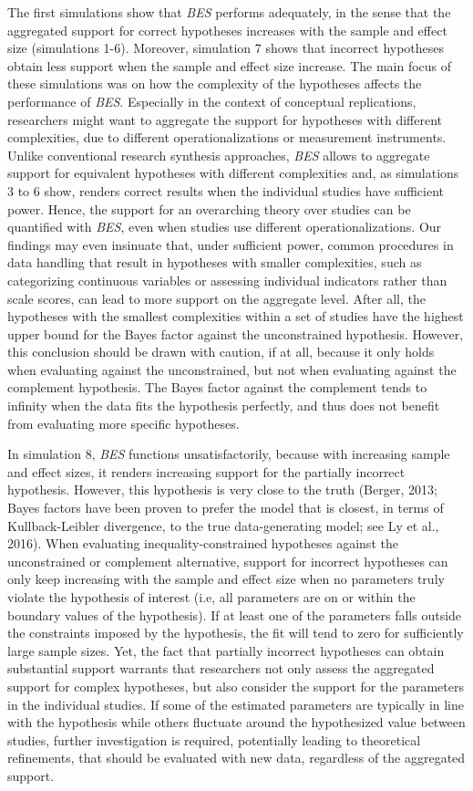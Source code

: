 \documentclass[
]{interact}
\begin{document}
The first simulations show that \emph{BES} performs adequately, in the
sense that the aggregated support for correct hypotheses increases with
the sample and effect size (simulations 1-6). Moreover, simulation 7
shows that incorrect hypotheses obtain less support when the sample and
effect size increase. The main focus of these simulations was on how the
complexity of the hypotheses affects the performance of \emph{BES}.
Especially in the context of conceptual replications, researchers might
want to aggregate the support for hypotheses with different
complexities, due to different operationalizations or measurement
instruments. Unlike conventional research synthesis approaches,
\emph{BES} allows to aggregate support for equivalent hypotheses with
different complexities and, as simulations 3 to 6 show, renders correct
results when the individual studies have sufficient power. Hence, the
support for an overarching theory over studies can be quantified with
\emph{BES}, even when studies use different operationalizations. Our
findings may even insinuate that, under sufficient power, common
procedures in data handling that result in hypotheses with smaller
complexities, such as categorizing continuous variables or assessing
individual indicators rather than scale scores, can lead to more support
on the aggregate level. After all, the hypotheses with the smallest
complexities within a set of studies have the highest upper bound for
the Bayes factor against the unconstrained hypothesis. However, this
conclusion should be drawn with caution, if at all, because it only
holds when evaluating against the unconstrained, but not when evaluating
against the complement hypothesis. The Bayes factor against the
complement tends to infinity when the data fits the hypothesis
perfectly, and thus does not benefit from evaluating more specific
hypotheses.

In simulation 8, \emph{BES} functions unsatisfactorily, because with
increasing sample and effect sizes, it renders increasing support for
the partially incorrect hypothesis. However, this hypothesis is very
close to the truth (Berger, 2013; Bayes factors have been proven to
prefer the model that is closest, in terms of Kullback-Leibler
divergence, to the true data-generating model; see Ly et al., 2016).
When evaluating inequality-constrained hypotheses against the
unconstrained or complement alternative, support for incorrect
hypotheses can only keep increasing with the sample and effect size when
no parameters truly violate the hypothesis of interest (i.e, all
parameters are on or within the boundary values of the hypothesis). If
at least one of the parameters falls outside the constraints imposed by
the hypothesis, the fit will tend to zero for sufficiently large sample
sizes. Yet, the fact that partially incorrect hypotheses can obtain
substantial support warrants that researchers not only assess the
aggregated support for complex hypotheses, but also consider the support
for the parameters in the individual studies. If some of the estimated
parameters are typically in line with the hypothesis while others
fluctuate around the hypothesized value between studies, further
investigation is required, potentially leading to theoretical
refinements, that should be evaluated with new data, regardless of the
aggregated support.
\end{document}
